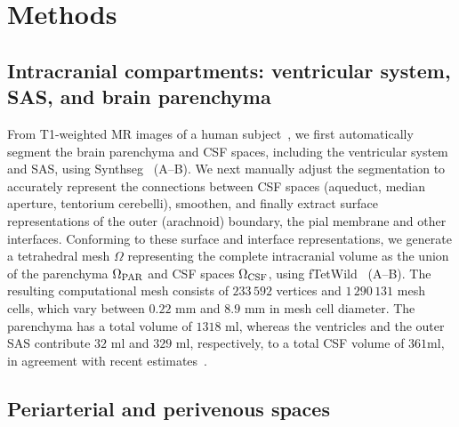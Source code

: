 \documentclass[fleqn,10pt]{wlscirep}
\begin{document}
\section*{Methods}

\subsection*{Intracranial compartments: ventricular system, SAS, and brain parenchyma}

From T1-weighted MR images of a human subject~\cite{hodneland2019new},
we first automatically segment the brain parenchyma and CSF spaces,
including the ventricular system and SAS, using
Synthseg~\cite{billot2023robust,billot2023synthseg}
(A--B). We next manually adjust the segmentation to
accurately represent the connections between CSF spaces (aqueduct,
median aperture, tentorium cerebelli), smoothen, and finally extract
surface representations of the outer (arachnoid) boundary, the pial
membrane and other interfaces. Conforming to these surface and
interface representations, we generate a tetrahedral mesh $\Omega$
representing the complete intracranial volume as the union of the
parenchyma $\Omega_{\rm PAR}$ and CSF spaces $\Omega_{\rm CSF}$, using
fTetWild~\cite{hu2020fast} (A--B). The resulting
computational mesh consists of $233\,592$ vertices and $1\,290\,131$
mesh cells, which vary between $0.22$ mm and $8.9$ mm in mesh cell
diameter. The parenchyma has a total volume of $1318$ ml, whereas the
ventricles and the outer SAS contribute $32$ ml and $329$ ml,
respectively, to a total CSF volume of $361$ml, in agreement with
recent estimates~\cite{hladky2024regulation}.

\subsection*{Periarterial and perivenous spaces}
\end{document}
